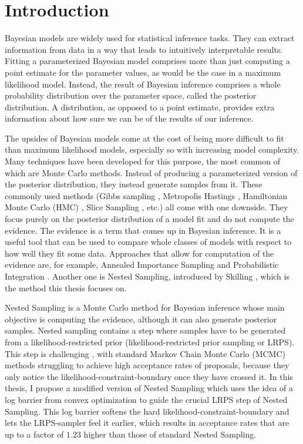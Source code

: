 \documentclass[12pt, a4paper]{report}
\begin{document}
\chapter*{Introduction}
Bayesian models are widely used for statistical inference tasks.
They can extract information from data in a way that leads to intuitively interpretable results.
Fitting a parameterized Bayesian model comprises more than just computing a point estimate for the parameter values, as would be the case in a maximum likelihood model.
Instead, the result of Bayesian inference comprises a whole probability distribution over the parameter space, called the posterior distribution.
A distribution, as opposed to a point estimate, provides extra information about how sure we can be of the results of our inference. 

The upsides of Bayesian models come at the cost of being more difficult to fit than maximum likelihood models, especially so with increasing model complexity.
Many techniques have been developed for this purpose, the most common of which are Monte Carlo methods.
Instead of producing a parameterized version of the posterior distribution, they instead generate samples from it.
These commonly used methods (Gibbs sampling \cite{gibbs}, Metropolis Hastings \cite{metropolishastings}, Hamiltonian Monte Carlo (HMC) \cite{hmc}, Slice Sampling \cite{slice_sampling}, etc.) all come with one downside.
They focus purely on the posterior distribution of a model fit and do not compute the evidence.
The evidence is a term that comes up in Bayesian inference.
It is a useful tool that can be used to compare whole classes of models with respect to how well they fit some data.
Approaches that allow for computation of the evidence are, for example, Annealed Importance Sampling \cite{annealed_importance_sampling} and Probabilistic Integration \cite{bayesian_cubature}.
Another one is Nested Sampling, introduced by Skilling \cite{skilling}, which is the method this thesis focuses on.

Nested Sampling is a Monte Carlo method for Bayesian inference whose main objective is computing the evidence, although it can also generate posterior samples.
Nested sampling contains a step where samples have to be generated from a likelihood-restricted prior (likelihood-restricted prior sampling or LRPS).
This step is challenging \cite[9]{hmc_in_ns}, with standard Markov Chain Monte Carlo (MCMC) methods struggling to achieve high acceptance rates of proposals, because they only notice the likelihood-constraint-boundary once they have crossed it.
In this thesis, I propose a modified version of Nested Sampling which uses the idea of a log barrier from convex optimization to guide the crucial LRPS step of Nested Sampling.
This log barrier softens the hard likelihood-constraint-boundary and lets the LRPS-sampler feel it earlier, which results in acceptance rates that are up to a factor of $1.23$ higher than those of standard Nested Sampling.
\end{document}
